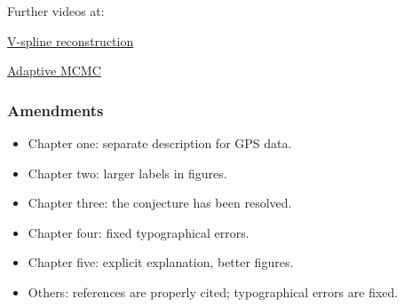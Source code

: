\documentclass{beamer}
\begin{document}
\begin{frame}

Further videos at:

\href{https://www.youtube.com/watch?v=lQOSt8HrYRU&t=61s}{V-spline reconstruction} 

\href{https://www.youtube.com/watch?v=CF6Sut3G6eI&t=67s}{Adaptive MCMC} 

\end{frame}




\begin{frame}
\frametitle{Amendments}
\begin{itemize}
	\item Chapter one: separate description for GPS data.
	\item Chapter two: larger labels in figures.
	\item Chapter three: the conjecture has been resolved.
	\item Chapter four: fixed typographical errors.
	\item Chapter five: explicit explanation, better figures.
	\item Others: references are properly cited; typographical errors are fixed.
\end{itemize}
\end{frame}
\end{document}
